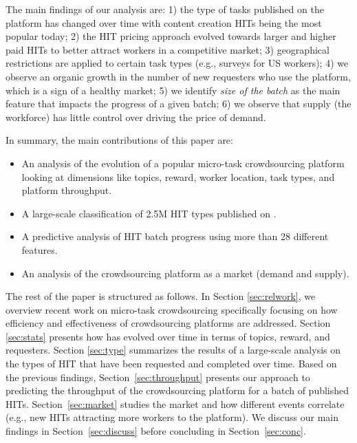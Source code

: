 The main findings of our analysis are: 1) the type of tasks published on the platform has changed over time with content creation HITs being the most popular today; 2) the HIT pricing approach evolved towards larger and higher paid HITs to better attract workers in a competitive market; 3) geographical restrictions are applied to certain task types (e.g., surveys for US workers); 4) we observe an organic growth in the number of new requesters who use the platform, which is a sign of a healthy market; 5) we identify \emph{size of the batch} as the main feature that impacts the progress of a given batch; 6) we observe that supply (the workforce) has little control over driving the price of demand.

In summary, the main contributions of this paper are:
\begin{itemize}[noitemsep,topsep=0pt,parsep=0pt,partopsep=0pt]

	\item An analysis of the evolution of a popular micro-task crowdsourcing platform looking at dimensions like topics, reward, worker location, task types, and platform throughput.

	\item A large-scale classification of 2.5M HIT types published on \amt{}.

	\item A predictive analysis of HIT batch progress using more than 28 different features.
	
	\item An analysis of the crowdsourcing platform as a market (demand and supply).
	
\end{itemize}


The rest of the paper is structured as follows.
In Section \ref{sec:relwork}, we overview recent work on micro-task crowdsourcing specifically focusing on how  efficiency and effectiveness  of crowdsourcing platforms are addressed.
Section \ref{sec:stats} presents how \amt{} has evolved over time in terms of topics, reward, and requesters.
Section \ref{sec:type} summarizes the results of a large-scale analysis on the types of HIT that have been requested and completed over time.
Based on the previous findings, Section~\ref{sec:throughput} presents our approach to predicting the throughput of the crowdsourcing platform for a batch of published HITs.
Section~\ref{sec:market} studies the \amt{} market and how different events correlate (e.g., new HITs attracting more workers to the platform).
We discuss our main findings in Section~\ref{sec:discuss} before concluding in 
Section~\ref{sec:conc}.

